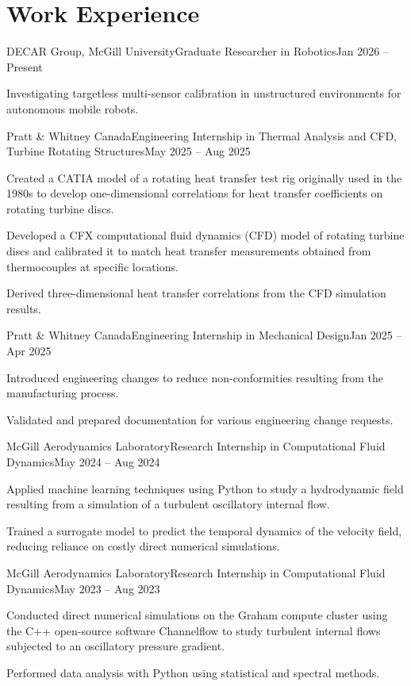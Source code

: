 \section{Work Experience}
\begin{joblong}{DECAR Group, McGill University}{Graduate Researcher in Robotics}{Jan 2026 -- Present}
\item Investigating targetless multi-sensor calibration in unstructured environments for autonomous mobile robots.
\end{joblong}

\begin{joblong}{Pratt \& Whitney Canada}{Engineering Internship in Thermal Analysis and CFD, Turbine Rotating Structures}{May 2025 -- Aug 2025}
\item Created a CATIA model of a rotating heat transfer test rig originally used in the 1980s to develop one-dimensional correlations for heat transfer coefficients on rotating turbine discs.
\item Developed a CFX computational fluid dynamics (CFD) model of rotating turbine discs and calibrated it to match heat transfer measurements obtained from thermocouples at specific locations.
\item Derived three-dimensional heat transfer correlations from the CFD simulation results.
\end{joblong}

\begin{joblong}{Pratt \& Whitney Canada}{Engineering Internship in Mechanical Design}{Jan 2025 -- Apr 2025}
\item Introduced engineering changes to reduce non-conformities resulting from the manufacturing process.
\item Validated and prepared documentation for various engineering change requests.
\end{joblong}

\begin{joblong}{McGill Aerodynamics Laboratory}{Research Internship in Computational Fluid Dynamics}{May 2024 -- Aug 2024}
\item Applied machine learning techniques using Python to study a hydrodynamic field resulting from a simulation of a turbulent oscillatory internal flow.
\item Trained a surrogate model to predict the temporal dynamics of the velocity field, reducing reliance on costly direct numerical simulations.
\end{joblong}

\begin{joblong}{McGill Aerodynamics Laboratory}{Research Internship in Computational Fluid Dynamics}{May 2023 -- Aug 2023}
\item Conducted direct numerical simulations on the Graham compute cluster using the C++ open-source software Channelflow to study turbulent internal flows subjected to an oscillatory pressure gradient.
\item Performed data analysis with Python using statistical and spectral methods.
\end{joblong}
